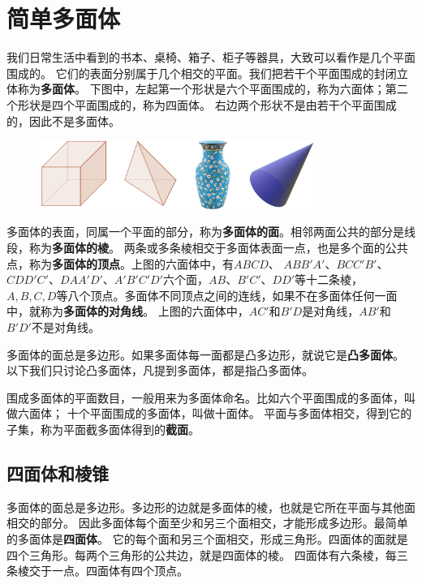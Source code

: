\documentclass[12pt,UTF8]{ctexbook}
\begin{document}
\chapter{简单多面体}
我们日常生活中看到的书本、桌椅、箱子、柜子等器具，大致可以看作是几个平面围成的。
它们的表面分别属于几个相交的平面。我们把若干个平面围成的封闭立体称为\textbf{多面体}。
下图中，左起第一个形状是六个平面围成的，称为六面体；第二个形状是四个平面围成的，称为四面体。
右边两个形状不是由若干个平面围成的，因此不是多面体。

\begin{figure}[h] 
    \centering
    \includegraphics[width=0.8\textwidth]{多面体1.png}
\end{figure}

多面体的表面，同属一个平面的部分，称为\textbf{多面体的面}。相邻两面公共的部分是线段，称为\textbf{多面体的棱}。
两条或多条棱相交于多面体表面一点，也是多个面的公共点，称为\textbf{多面体的顶点}。上图的六面体中，有$ABCD$、
$ABB'A'$、$BCC'B'$、$CDD'C'$、$DAA'D'$、$A'B'C'D'$六个面，$AB$、$B'C'$、$DD'$等十二条棱，
$A,B,C,D$等八个顶点。多面体不同顶点之间的连线，如果不在多面体任何一面中，就称为\textbf{多面体的对角线}。
上图的六面体中，$AC'$和$B'D$是对角线，$AB'$和$B'D'$不是对角线。

多面体的面总是多边形。如果多面体每一面都是凸多边形，就说它是\textbf{凸多面体}。
以下我们只讨论凸多面体，凡提到多面体，都是指凸多面体。

围成多面体的平面数目，一般用来为多面体命名。比如六个平面围成的多面体，叫做六面体；
十个平面围成的多面体，叫做十面体。
平面与多面体相交，得到它的子集，称为平面截多面体得到的\textbf{截面}。

\section{四面体和棱锥}
多面体的面总是多边形。多边形的边就是多面体的棱，也就是它所在平面与其他面相交的部分。
因此多面体每个面至少和另三个面相交，才能形成多边形。最简单的多面体是\textbf{四面体}。
它的每个面和另三个面相交，形成三角形。四面体的面就是四个三角形。每两个三角形的公共边，就是四面体的棱。
四面体有六条棱，每三条棱交于一点。四面体有四个顶点。
\end{document}

